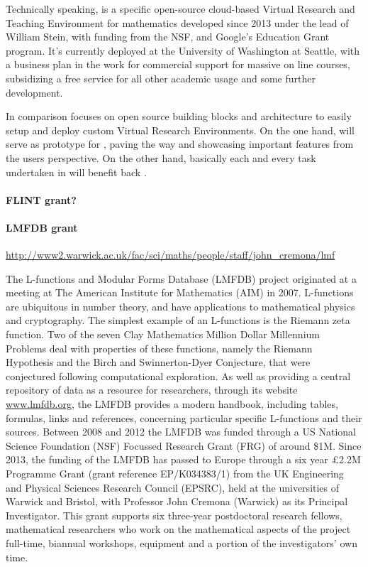 Technically speaking, \SMC is a specific open-source cloud-based
Virtual Research and Teaching Environment for mathematics developed
since 2013 under the lead of William Stein, with funding from the NSF,
and Google's Education Grant program. It's currently deployed at the
University of Washington at Seattle, with a business plan in the work
for commercial support for massive on line courses, subsidizing a free
service for all other academic usage and some further \Sage
development.

In comparison \TheProject focuses on open source building blocks and
architecture to easily setup and deploy custom Virtual Research
Environments. On the one hand, \SMC will serve as prototype for
\TheProject, paving the way and showcasing important features from the
users perspective. On the other hand, basically each and every task
undertaken in \TheProject will benefit back \SMC.

\paragraph{FLINT grant?}

\paragraph{LMFDB grant}\url{http://www2.warwick.ac.uk/fac/sci/maths/people/staff/john_cremona/lmf}

The L-functions and Modular Forms Database (LMFDB) project originated
at a meeting at The American Institute for Mathematics (AIM) in 2007.
L-functions are ubiquitous in number theory, and have applications to
mathematical physics and cryptography. The simplest example of an
L-functions is the Riemann zeta function. Two of the seven Clay
Mathematics Million Dollar Millennium Problems deal with properties of
these functions, namely the Riemann Hypothesis and the Birch and
Swinnerton-Dyer Conjecture, that were conjectured following
computational exploration.  As well as providing a central repository
of data as a resource for researchers, through its website
\url{www.lmfdb.org}, the LMFDB provides a modern handbook, including
tables, formulas, links and references, concerning particular specific
L-functions and their sources.  Between 2008 and 2012 the LMFDB was
funded through a US National Science Foundation (NSF) Focussed
Research Grant (FRG) of around \$1M.  Since 2013, the funding of the%
LMFDB has passed to Europe through a six year £2.2M Programme Grant
(grant reference EP/K034383/1) from the UK Engineering and Physical
Sciences Research Council (EPSRC), held at the universities of Warwick
and Bristol, with Professor John Cremona (Warwick) as its Principal
Investigator.  This grant supports six three-year postdoctoral
research fellows, mathematical researchers who work on the
mathematical aspects of the project full-time, biannual workshops,
equipment and a portion of the investigators' own time.

